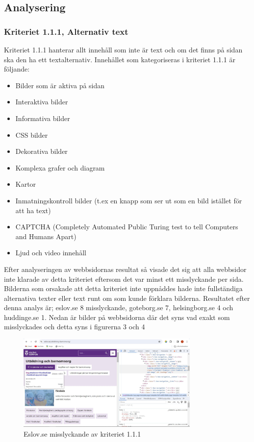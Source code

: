 \documentclass[11p]{article}
\begin{document}
    \subsection{Analysering}
    
    \subsubsection{Kriteriet 1.1.1, Alternativ text}
    Kriteriet 1.1.1 hanterar allt innehåll som inte är text och om det finns på sidan ska den ha ett textalternativ.
    Innehållet som kategoriseras i kriteriet 1.1.1 är följande:

    \begin{itemize}
        \item Bilder som är aktiva på sidan
        \item Interaktiva bilder
        \item Informativa bilder
        \item CSS bilder
        \item Dekorativa bilder
        \item Komplexa grafer och diagram
        \item Kartor
        \item Inmatningskontroll bilder (t.ex en knapp som ser ut som en bild istället för att ha text)
        \item CAPTCHA (Completely Automated Public Turing test to tell Computers and Humans Apart)
        \item Ljud och video innehåll
    \end{itemize}

    Efter analyseringen av webbsidornas resultat så visade det sig att alla webbsidor inte klarade av detta kriteriet eftersom det var minst ett misslyckande per sida.
    Bilderna som orsakade att detta kriteriet inte uppnåddes hade inte fullständiga alternativa texter eller text runt om som kunde förklara bilderna.
    Resultatet efter denna analys är; eslov.se 8 misslyckande, goteborg.se 7, helsingborg.se 4 och huddinge.se 1.
    Nedan är bilder på webbsidorna där det syns vad exakt som misslyckades och detta syns i figurerna 3 och 4

    \begin{figure}[hbt!]
        \includegraphics[width=0.8\textwidth]{../images/Eslov111.jpg}
        \caption{ Eslov.se misslyckande av kriteriet 1.1.1 }
    \end{figure}
\end{document}
